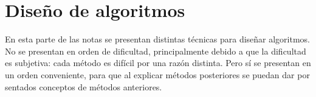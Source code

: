 
\part{Diseño de algoritmos}

En esta parte de las notas se presentan distintas técnicas para diseñar algoritmos. No se presentan en orden de dificultad, principalmente debido a que la dificultad es subjetiva: cada método es difícil por una razón distinta. Pero sí se presentan en un orden conveniente, para que al explicar métodos posteriores se puedan dar por sentados conceptos de métodos anteriores.

